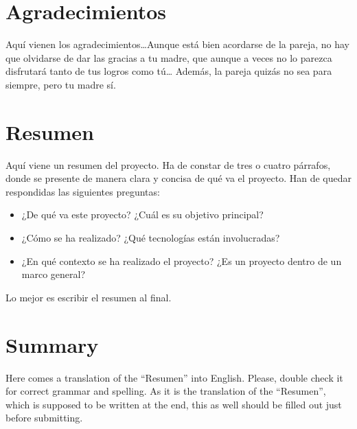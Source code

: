 \documentclass[a4paper, 12pt]{book}
\begin{document}
\chapter*{Agradecimientos}

Aquí vienen los agradecimientos\ldots Aunque está bien acordarse de la pareja, no hay que olvidarse de dar las gracias a tu madre, que aunque a veces no lo parezca disfrutará tanto de tus logros como tú\ldots 
Además, la pareja quizás no sea para siempre, pero tu madre sí.


\chapter*{Resumen}

Aquí viene un resumen del proyecto.
Ha de constar de tres o cuatro párrafos, donde se presente de manera clara y concisa de qué va el proyecto. 
Han de quedar respondidas las siguientes preguntas:

\begin{itemize}
  \item ¿De qué va este proyecto? ¿Cuál es su objetivo principal?
  \item ¿Cómo se ha realizado? ¿Qué tecnologías están involucradas?
  \item ¿En qué contexto se ha realizado el proyecto? ¿Es un proyecto dentro de un marco general?
\end{itemize}

Lo mejor es escribir el resumen al final.


\chapter*{Summary}

Here comes a translation of the ``Resumen'' into English. 
Please, double check it for correct grammar and spelling.
As it is the translation of the ``Resumen'', which is supposed to be written at the end, this as well should be filled out just before submitting.
\end{document}
